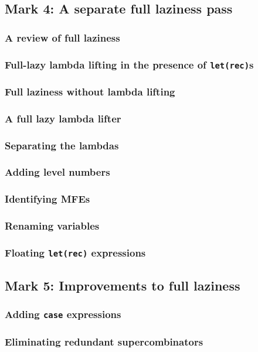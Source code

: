 \documentclass{jarticle}
\begin{document}
\subsection{Mark 4: A separate full laziness pass}
\subsubsection{A review of full laziness}
\subsubsection{Full-lazy lambda lifting in the presence of \texttt{let(rec)}s}
\subsubsection{Full laziness without lambda lifting}
\subsubsection{A full lazy lambda lifter}
\subsubsection{Separating the lambdas}
\subsubsection{Adding level numbers}
\subsubsection{Identifying MFEs}
\subsubsection{Renaming variables}
\subsubsection{Floating \texttt{let(rec)} expressions}
\newpage

\subsection{Mark 5: Improvements to full laziness}
\subsubsection{Adding \texttt{case} expressions}
\subsubsection{Eliminating redundant supercombinators}
\end{document}
